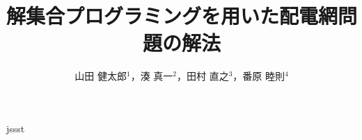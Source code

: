 \documentclass[japanese,draft]{jssst_ppl} %
\title{解集合プログラミングを用いた配電網問題の解法}
\author{山田 健太郎$^1$，湊 真一$^2$，田村 直之$^3$，番原 睦則$^4$}
\begin{document}
\maketitle
\begin{abstract}
%
\end{abstract}







%

 {jssst}
\end{document}
